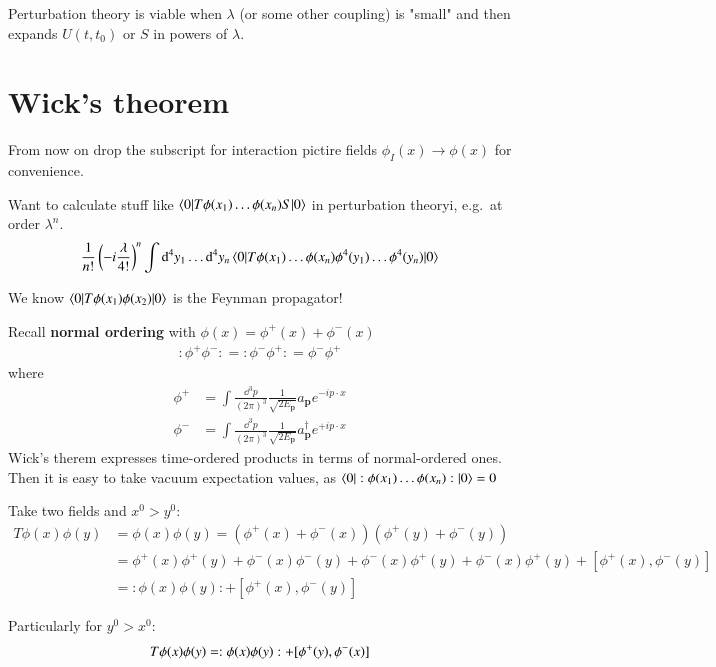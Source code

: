 Perturbation theory is viable when $\lambda$ (or some other coupling) is "small" and then expands $U(t,t_0)$ or $S$ in powers of $\lambda$.

\section{Wick's theorem}
From now on drop the subscript for interaction pictire fields $\phi_I(x) \rightarrow \phi(x)$ for convenience.

Want to calculate stuff like $\braket{0 | T\phi(x_1)\dots\phi(x_n)S | 0}$ in perturbation theoryi, e.g.\ at order $\lambda^n$.  
\begin{align}
\frac{1}{n!} \left( -i\frac{\lambda}{4!} \right)^n \int \dd^4 y_1 \dots \dd^4 y_n \braket{0 | T\phi(x_1)\dots\phi(x_n)\phi^4(y_1)\dots\phi^4(y_n) | 0}
\end{align}

We know $\braket{0 | T\phi(x_1)\phi(x_2) | 0 } $ is the Feynman propagator!

Recall \textbf{normal ordering} with $\phi(x) = \phi^+(x) + \phi^-(x)$
\begin{align}
	:\phi^+ \phi^-: = :\phi^- \phi^+: = \phi^- \phi^+
\end{align} 
where
\begin{align}
\phi^+ &= \int \frac{\dd^3 p}{(2\pi)^3} \frac{1}{\sqrt{2E_{\pmb{p}}}} a_{\pmb{p}} e^{-ip\cdot x} \\
	\phi^- &= \int \frac{\dd^3 p}{(2\pi)^3} \frac{1}{\sqrt{2E_{\pmb{p}}}} a^\dagger_{\pmb{p}} e^{+ip\cdot x}
\end{align}
Wick's therem expresses time-ordered products in terms of normal-ordered ones. Then it is easy to take vacuum expectation values, as $\braket{0 | :\phi(x_1)\dots\phi(x_n):|0} = 0$

Take two fields and $x^0 > y^0$:
\begin{align*}
	T \phi(x)\phi(y) &= \phi(x)\phi(y) = \left(\phi^+(x)+\phi^-(x)\right)\left(\phi^+(y)+\phi^-(y)\right) \\
	&= \phi^+(x)\phi^+(y) + \phi^-(x)\phi^-(y) + \phi^-(x) \phi^+(y) + \phi^-(x) \phi^+(y) + [\phi^+(x), \phi^-(y)] \\
	&= :\phi(x)\phi(y): + [\phi^+(x),\phi^-(y)]
\end{align*} 

Particularly for $y^0 > x^0$: 
\begin{align}
	T\phi(x)\phi(y) = :\phi(x)\phi(y): + [\phi^+(y),\phi^-(x)] \notag
\end{align}

